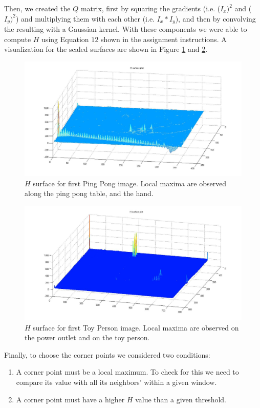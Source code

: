 \documentclass[11pt]{article}
\begin{document}
Then, we created the $Q$ matrix, first by squaring the gradients (i.e.
($I_x)^2$ and ($I_y)^2$) and multiplying them with each other (i.e. $I_x *
I_y$), and then by convolving the resulting with a Gaussian kernel. With these
components we were able to compute $H$ using Equation $12$ shown in the
assignment instructions. A visualization for the scaled surfaces are shown in
Figure \ref{fig:surface_pingpong} and \ref{fig:surface_person}.

\begin{figure}[H] \centering
	\includegraphics[width=1\textwidth]{imgs/surface_pingpong.jpg}
	\caption{$H$ surface for first Ping Pong image. Local maxima are
		observed along the ping pong table, and the hand.}
	\label{fig:surface_pingpong}
\end{figure}

\begin{figure}[H] \centering
	\includegraphics[width=1\textwidth]{imgs/surface_person.jpg}
	\caption{$H$ surface for first Toy Person image. Local maxima are
		observed on the power outlet and on the toy person.}
	\label{fig:surface_person}
\end{figure}

Finally, to choose the corner points we considered two conditions:
\begin{enumerate} 
	\item A corner point must be a local maximum. To check for
		this we need to compare its value with all its neighbors' within
		a given window.
	\item A corner point must have a higher $H$
		value than a given threshold.
\end{enumerate}
\end{document}
